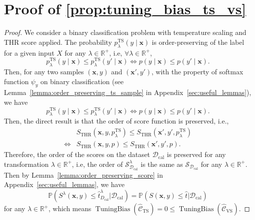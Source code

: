 \documentclass{article}
\renewcommand{\P}{\mathbb{P}}
\newcommand{\1}{\mathbbm{1}}
\newcommand{\TuningBias}{\mathop{\text{TuningBias}}}
\newcommand{\of}[1]{\left(#1\right)}
\theoremstyle{plain}
\theoremstyle{definition}
\theoremstyle{remark}
\begin{document}
\section{Proof of \cref{prop:tuning_bias_ts_vs}}
\label{sec:proof_tuning_bias_ts_vs}
\begin{proof}
    We consider a binary classification problem with temperature scaling and THR score applied.
    The probability \(p^{\text{TS}}_{\lambda}(y\mid \boldsymbol{x})\) is order-preserving of the label for a given input $X$ for any $\lambda \in \mathbb{R}^+$, i.e, \(\forall \lambda \in \mathbb{R}^+\),
    \begin{equation}\label{eq:order_preserving_label}
        p^{\text{TS}}_{\lambda}(y\mid \boldsymbol{x}) \leq p^{\text{TS}}_{\lambda}(y'\mid \boldsymbol{x}) \iff p(y\mid \boldsymbol{x}) \leq p(y'\mid \boldsymbol{x}).
    \end{equation}
    Then, for any two samples $(\boldsymbol{x}, y)$ and $(\boldsymbol{x}', y')$, with the property of softmax function \(\psi_y\) on binary classification (see Lemma~\ref{lemma:order_preserving_ts_sample} in Appendix~\ref{sec:useful_lemmas}), we have
    \begin{equation}\label{eq:order_preserving_sample}
    p^{\text{TS}}_{\lambda}(y\mid \boldsymbol{x}) \leq p^{\text{TS}}_{\lambda}(y'\mid \boldsymbol{x}) \iff p(y\mid \boldsymbol{x}) \leq p(y'\mid \boldsymbol{x}).
    \end{equation}
    Then, the direct result is that the order of score function is preserved, i.e.,
    \begin{align*}
        & S_{\text{THR}}(\boldsymbol{x}, y, p^{\text{TS}}_{\lambda}) \leq S_{\text{THR}}(\boldsymbol{x}', y', p^{\text{TS}}_{\lambda}) \\ 
        \iff 
        & S_{\text{THR}}(\boldsymbol{x}, y, p) \leq S_{\text{THR}}(\boldsymbol{x}', y', p).
    \end{align*}
    Therefore, the order of the scores on the dataset \(\mathcal{D}_{\text{cal}}\) is preserved for any transformation \(\lambda \in \mathbb{R}^+\), i.e, the order of \(\mathcal{S}^{\lambda}_{\mathcal{D}_{\text{cal}}}\) is the same as \(\mathcal{S}_{\mathcal{D}_{\text{cal}}}\) for any \(\lambda \in \mathbb{R}^+\). 
    Then by Lemma~\ref{lemma:order_preserving_score} in Appendix~\ref{sec:useful_lemmas}, we have 
    \begin{equation}\label{eq:order_preserving_score}
    \P\of{S^{\lambda}(\boldsymbol{x}, y)\leq \hat{t}^{\lambda}_{D_{\text{cal}}} | \mathcal{D}_{\text{cal}}} = 
    \P\of{S(\boldsymbol{x}, y)\leq \hat{t} | \mathcal{D}_{\text{cal}}}
    \end{equation}
    for any $\lambda \in \mathbb{R}^+$, which means \(\TuningBias(\widehat{\mathcal{C}}_{\text{TS}}) = 0 \leq \TuningBias(\widehat{\mathcal{C}}_{\text{VS}})\).
    
\end{proof}
\end{document}
